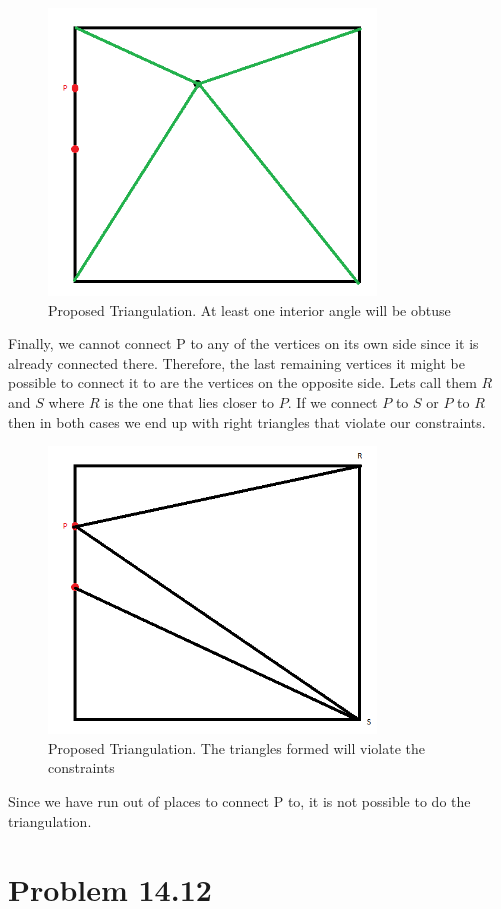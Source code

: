 \documentclass[11pt,psfig]{article}
\begin{document}
\begin{figure}[H]
\centering
\includegraphics[height=3in]{hw5prob3_diagram2.png}
\caption{Proposed Triangulation. At least one interior angle will be obtuse}
\end{figure} 
Finally, we cannot connect P to any of the vertices on its own side since it is already connected there. Therefore, the last remaining vertices it might be possible to connect it to are the vertices on the opposite side. Lets call them $R$ and $S$ where $R$ is the one that lies closer to $P$. If we connect $P$ to $S$ or $P$ to $R$ then in both cases we end up with right triangles that violate our constraints.
\begin{figure}[H]
\centering
\includegraphics[height=3in]{hw5prob3_diagram3.png}
\caption{Proposed Triangulation. The triangles formed will violate the constraints}
\end{figure}  
Since we have run out of places to connect P to, it is not possible to do the triangulation.
\newpage

\section*{Problem 14.12}
\end{document}
